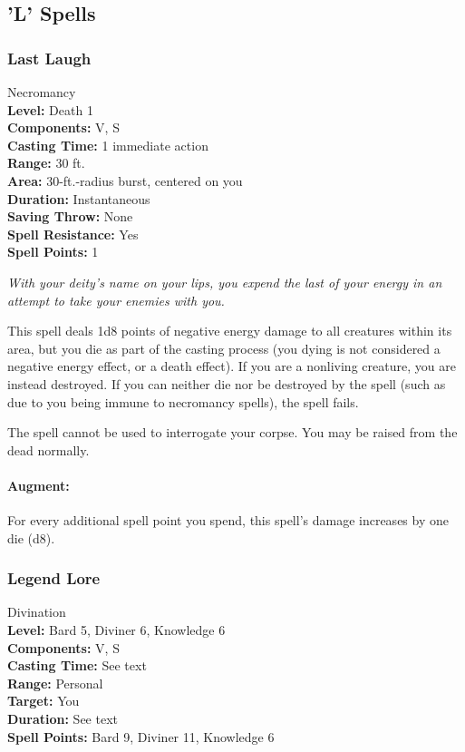 \subsection{'L' Spells}
\subsubsection{Last Laugh}
\label{Spell:LastLaugh}
Necromancy
\\ \textbf{Level:} Death 1
\\ \textbf{Components:} V, S
\\ \textbf{Casting Time:} 1 immediate action
\\ \textbf{Range:} 30 ft.
\\ \textbf{Area:} 30-ft.-radius burst, centered on you
\\ \textbf{Duration:} Instantaneous
\\ \textbf{Saving Throw:} None
\\ \textbf{Spell Resistance:} Yes
\\ \textbf{Spell Points:} 1

\emph{With your deity's name on your lips, you expend the last of your energy in an attempt to take your enemies with you.}

This spell deals 1d8 points of negative energy damage to all creatures within its area, but you die as part of the casting process (you dying is not considered a negative energy effect, or a death effect). If you are a nonliving creature, you are instead destroyed. If you can neither die nor be destroyed by the spell (such as due to you being immune to necromancy spells), the spell fails.

The  spell cannot be used to interrogate your corpse. You may be raised from the dead normally.

\paragraph{Augment:} For every additional spell point you spend, this spell's damage increases by one die (d8).
\subsubsection{Legend Lore}
\label{Spell:LegendLore}
Divination
\\ \textbf{Level:} Bard 5, Diviner 6, Knowledge 6
\\ \textbf{Components:} V, S
\\ \textbf{Casting Time:} See text
\\ \textbf{Range:} Personal
\\ \textbf{Target:} You
\\ \textbf{Duration:} See text
\\ \textbf{Spell Points:} Bard 9, Diviner 11, Knowledge 6

